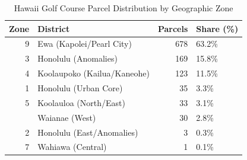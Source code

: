 \begin{table}[!h]
\centering
\caption{\label{tab:hawaii_geo}Hawaii Golf Course Parcel Distribution by Geographic Zone}
\centering
\begin{tabular}[t]{rlrl}
\toprule
Zone & District & Parcels & Share (\%)\\
\midrule
9 & Ewa (Kapolei/Pearl City) & 678 & 63.2\%\\
3 & Honolulu (Anomalies) & 169 & 15.8\%\\
4 & Koolaupoko (Kailua/Kaneohe) & 123 & 11.5\%\\
1 & Honolulu (Urban Core) & 35 & 3.3\%\\
5 & Koolauloa (North/East) & 33 & 3.1\%\\
\addlinespace
8 & Waianae (West) & 30 & 2.8\%\\
2 & Honolulu (East/Anomalies) & 3 & 0.3\%\\
7 & Wahiawa (Central) & 1 & 0.1\%\\
\bottomrule
\end{tabular}
\end{table}
